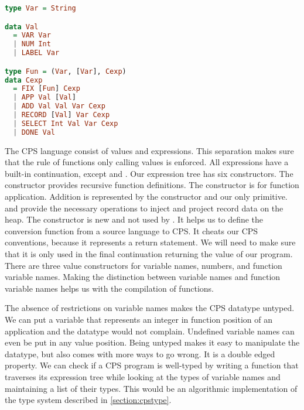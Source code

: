 \begin{lstlisting}[language=Haskell]
type Var = String

data Val
  = VAR Var
  | NUM Int
  | LABEL Var

type Fun = (Var, [Var], Cexp)
data Cexp
  = FIX [Fun] Cexp
  | APP Val [Val]
  | ADD Val Val Var Cexp
  | RECORD [Val] Var Cexp
  | SELECT Int Val Var Cexp
  | DONE Val
\end{lstlisting}

The \ac{CPS} language consist of values and expressions. This separation makes sure that the rule of functions only calling values is enforced. All expressions have a built-in continuation, except  and . Our expression tree has six constructors. The  constructor provides recursive function definitions. The  constructor is for function application. Addition is represented by the  constructor and our only primitive.  and  provide the necessary operations to inject and project record data on the heap. The  constructor is new and not used by \citeauthor{DBLP:books/daglib/0022396}. It helps us to define the conversion function from a source language to \ac{CPS}. It cheats our \ac{CPS} conventions, because it represents a return statement. We will need to make sure that it is only used in the final continuation returning the value of our program. There are three value constructors for variable names, numbers, and function variable names. Making the distinction between variable names and function variable names helps us with the compilation of functions. 

The absence of restrictions on variable names makes the \ac{CPS} datatype untyped. We can put a variable that represents an integer in function position of an application and the datatype would not complain. Undefined variable names can even be put in any value position. Being untyped makes it easy to manipulate the datatype, but also comes with more ways to go wrong. It is a double edged property. We can check if a \ac{CPS} program is well-typed by writing a function that traverses its expression tree while looking at the types of variable names and maintaining a list of their types. This would be an algorithmic implementation of the type system described in \ref{section:cpstype}.

